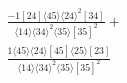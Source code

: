 \documentclass[varwidth, border=5pt]{standalone}
\begin{document}
\begin{my}
$\begin{gathered}
\scriptscriptstyle\frac{-1[24]⟨45⟩⟨24⟩^2[34]}{⟨14⟩⟨34⟩^2⟨35⟩[35]^2}+\\
\scriptscriptstyle\frac{1⟨45⟩⟨24⟩[45]⟨25⟩[23]}{⟨14⟩⟨34⟩^2⟨35⟩[35]^2}\phantom{+}
\end{gathered}$
\end{my}
\end{document}
